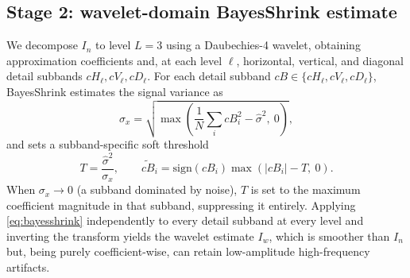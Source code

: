 \documentclass[final,3p,times,twocolumn,nopreprintline]{elsarticle}
\begin{document}
\subsection{Stage 2: wavelet-domain BayesShrink estimate}
We decompose $I_n$ to level $L=3$ using a Daubechies-4 wavelet, obtaining approximation coefficients and, at each level $\ell$, horizontal, vertical, and diagonal detail subbands $cH_\ell, cV_\ell, cD_\ell$. For each detail subband $cB \in \{cH_\ell, cV_\ell, cD_\ell\}$, BayesShrink \cite{chang2000adaptive} estimates the signal variance as
\begin{equation}
\sigma_x = \sqrt{\max\left(\frac{1}{N}\sum_{i} cB_i^2 - \hat\sigma^2,\ 0\right)},
\label{eq:sigmax}
\end{equation}
and sets a subband-specific soft threshold
\begin{equation}
T = \frac{\hat\sigma^2}{\sigma_x}, \qquad
\tilde{cB}_i = \mathrm{sign}(cB_i)\max(|cB_i| - T,\ 0).
\label{eq:bayesshrink}
\end{equation}
When $\sigma_x \to 0$ (a subband dominated by noise), $T$ is set to the maximum coefficient magnitude in that subband, suppressing it entirely. Applying \eqref{eq:bayesshrink} independently to every detail subband at every level and inverting the transform yields the wavelet estimate $I_w$, which is smoother than $I_n$ but, being purely coefficient-wise, can retain low-amplitude high-frequency artifacts.
\end{document}
